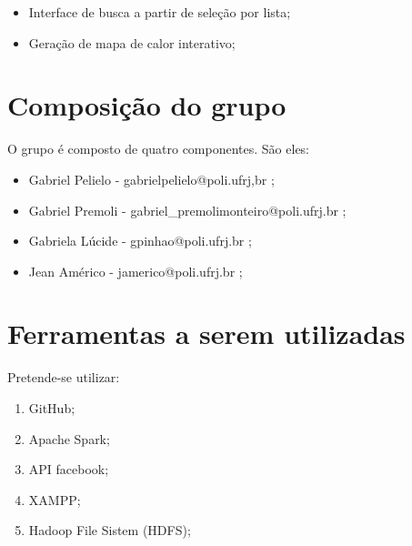 \documentclass[numbers,a4paper,12pt]{article}
\begin{document}
\begin{itemize}
	\item Interface de busca a partir de seleção por lista;
	\item Geração de mapa de calor interativo;
\end{itemize}

\section{Composição do grupo}

O grupo é composto de quatro componentes. São eles:

\begin{itemize}
	\item Gabriel Pelielo - gabrielpelielo@poli.ufrj,br ;
	\item Gabriel Premoli - gabriel\_premolimonteiro@poli.ufrj.br ;
	\item Gabriela Lúcide - gpinhao@poli.ufrj.br ;
	\item Jean Américo - jamerico@poli.ufrj.br ;
\end{itemize}

\section{Ferramentas a serem utilizadas}

Pretende-se utilizar:

\begin{enumerate}
	\item GitHub;
	\item Apache Spark;
	\item API facebook;
	\item XAMPP;
	\item Hadoop File Sistem (HDFS);
\end{enumerate}


%
%

\end{document}
